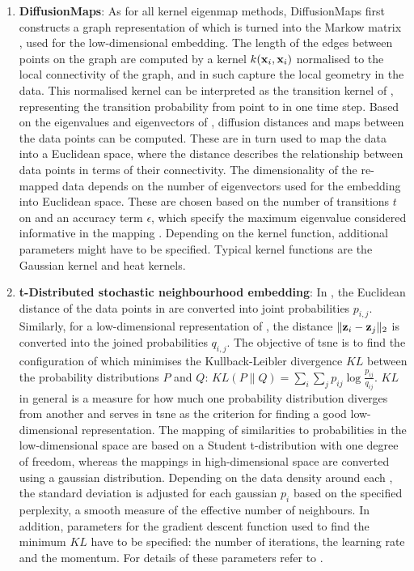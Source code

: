 \begin{enumerate}
\item\textbf{DiffusionMaps}: As for all kernel eigenmap methods, DiffusionMaps first constructs a graph representation of  which is turned into the Markow matrix , used for the low-dimensional embedding. The length of the edges between points on the graph are computed by a kernel \(k(\boldsymbol{\mathbf{x}}_{i},\boldsymbol{\mathbf{x}}_{i})\) normalised to the local connectivity of the graph, and in such capture the local geometry in the data. This normalised kernel can be interpreted as the transition kernel of , representing the transition probability from point  to  in one time step. Based on the eigenvalues and eigenvectors of , diffusion distances and maps between the data points can be computed. These are in turn used to map the data into a Euclidean space, where the distance describes the relationship between data points in terms of their connectivity. The dimensionality of the re-mapped data depends on the number of eigenvectors used for the embedding into Euclidean space. These are chosen based on the number of transitions \(t\) on  and an accuracy term \(\epsilon\), which specify the maximum eigenvalue considered informative in the mapping \citep{Coifman2005,Coifman2006}. Depending on the kernel function, additional parameters might have to be specified. Typical kernel functions are the Gaussian kernel and  heat kernels.

\item\textbf{t-Distributed stochastic neighbourhood embedding}: In , the Euclidean distance of the data points in  are converted into joint probabilities \(p_{i,j}\). Similarly, for  a low-dimensional representation  of , the distance  \(\lVert \boldsymbol{\mathbf{z}}_{i} -\boldsymbol{\mathbf{z}}_{j}\rVert_2 \) is converted into the joined probabilities \(q_{i,j}\). The objective of \gls{tsne} is to find the configuration of  which minimises the Kullback-Leibler divergence \(KL\) between the probability distributions \(P\) and \(Q\): \(KL(P\lVert Q) = \sum_i \sum_j p_{ij}\log\frac{p_{ij}}{q_{ij}}\). \(KL\) in general is a measure for how much one probability distribution diverges from another \citep{Kullback1951} and serves in \gls{tsne} as the criterion for finding a good low-dimensional representation. The mapping of similarities to probabilities in the low-dimensional space are based on a Student t-distribution with one degree of freedom, whereas the mappings in high-dimensional space are converted using a gaussian distribution. Depending on the data density around each , the standard deviation is adjusted for each gaussian \(p_i\) based on the specified perplexity, a smooth measure of the effective number of neighbours. In addition, parameters for the gradient descent function used to find the minimum \(KL\) have to be specified:  the number of iterations, the learning rate and the momentum. For details of these parameters refer to \citep{Maaten2008}.
\end{enumerate}

